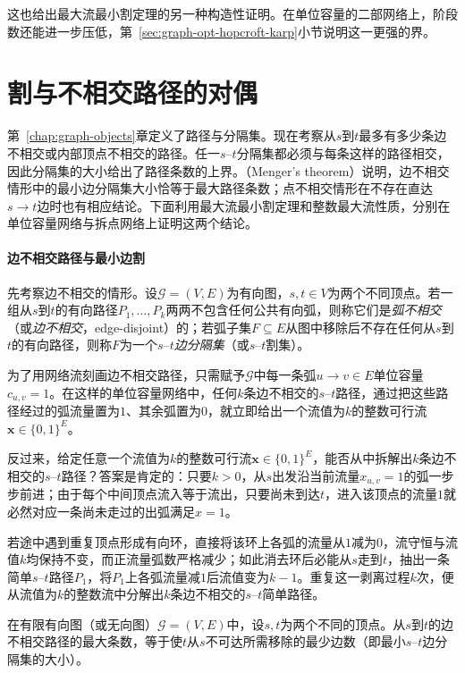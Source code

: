 这也给出最大流最小割定理的另一种构造性证明。在单位容量的二部网络上，阶段数还能进一步压低，第~\ref{sec:graph-opt-hopcroft-karp}小节说明这一更强的界。

\section{割与不相交路径的对偶}
\label{sec:flow-menger-duality}

第~\ref{chap:graph-objects}章定义了路径与分隔集。现在考察从$s$到$t$最多有多少条边不相交或内部顶点不相交的路径。任一$s$--$t$分隔集都必须与每条这样的路径相交，因此分隔集的大小给出了路径条数的上界。（Menger's theorem）说明，边不相交情形中的最小边分隔集大小恰等于最大路径条数；点不相交情形在不存在直达$s\to t$边时也有相应结论。下面利用最大流最小割定理和整数最大流性质，分别在单位容量网络与拆点网络上证明这两个结论。

\paragraph{边不相交路径与最小边割}
先考察边不相交的情形。设$\mathcal G=(V,E)$为有向图，$s,t\in V$为两个不同顶点。若一组从$s$到$t$的有向路径$P_1,\ldots,P_k$两两不包含任何公共有向弧，则称它们是\emph{弧不相交}（或\emph{边不相交}，edge-disjoint）的；若弧子集$F\subseteq E$从图中移除后不存在任何从$s$到$t$的有向路径，则称$F$为一个$s$--$t$\emph{边分隔集}（或$s$--$t$割集）。

为了用网络流刻画边不相交路径，只需赋予$\mathcal G$中每一条弧$u\to v\in E$单位容量$c_{u,v}=1$。在这样的单位容量网络中，任何$k$条边不相交的$s$--$t$路径，通过把这些路径经过的弧流量置为$1$、其余弧置为$0$，就立即给出一个流值为$k$的整数可行流$\bm x\in\{0,1\}^E$。

反过来，给定任意一个流值为$k$的整数可行流$\bm x\in\{0,1\}^E$，能否从中拆解出$k$条边不相交的$s$--$t$路径？答案是肯定的：只要$k>0$，从$s$出发沿当前流量$x_{u,v}=1$的弧一步步前进；由于每个中间顶点流入等于流出，只要尚未到达$t$，进入该顶点的流量$1$就必然对应一条尚未走过的出弧满足$x=1$。

若途中遇到重复顶点形成有向环，直接将该环上各弧的流量从$1$减为$0$，流守恒与流值$k$均保持不变，而正流量弧数严格减少；如此消去环后必能从$s$走到$t$，抽出一条简单$s$--$t$路径$P_1$，将$P_1$上各弧流量减$1$后流值变为$k-1$。重复这一剥离过程$k$次，便从流值为$k$的整数流中分解出$k$条边不相交的$s$--$t$简单路径。

\begin{theorem}
\label{thm:menger-edge}
在有限有向图（或无向图）$\mathcal G=(V,E)$中，设$s,t$为两个不同的顶点。从$s$到$t$的边不相交路径的最大条数，等于使$t$从$s$不可达所需移除的最少边数（即最小$s$--$t$边分隔集的大小）。
\end{theorem}

